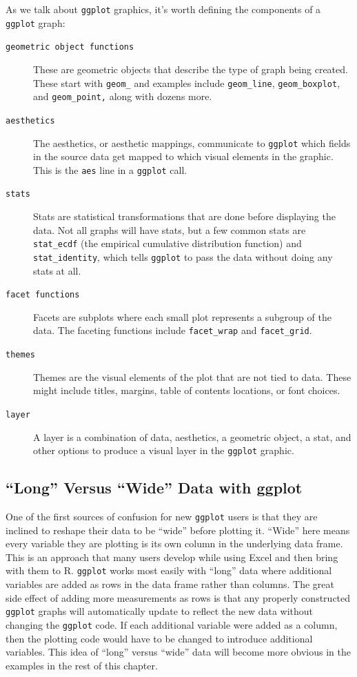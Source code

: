 \documentclass[
]{book}
\begin{document}
As we talk about \texttt{ggplot} graphics, it's worth defining the components of a \texttt{ggplot} graph:

\begin{description}
\item[\texttt{geometric\ object\ functions}]
These are geometric objects that describe the type of graph being created. These start with \texttt{geom\_} and examples include \texttt{geom\_line}, \texttt{geom\_boxplot}, and \texttt{geom\_point,} along with dozens more.
\item[\texttt{aesthetics}]
The aesthetics, or aesthetic mappings, communicate to \texttt{ggplot} which fields in the source data get mapped to which visual elements in the graphic. This is the \texttt{aes} line in a \texttt{ggplot} call.
\item[\texttt{stats}]
Stats are statistical transformations that are done before displaying the data. Not all graphs will have stats, but a few common stats are \texttt{stat\_ecdf} (the empirical cumulative distribution function) and \texttt{stat\_identity}, which tells \texttt{ggplot} to pass the data without doing any stats at all.
\item[\texttt{facet\ functions}]
Facets are subplots where each small plot represents a subgroup of the data. The faceting functions include \texttt{facet\_wrap} and \texttt{facet\_grid}.
\item[\texttt{themes}]
Themes are the visual elements of the plot that are not tied to data. These might include titles, margins, table of contents locations, or font choices.
\item[\texttt{layer}]
A layer is a combination of data, aesthetics, a geometric object, a stat, and other options to produce a visual layer in the \texttt{ggplot} graphic.
\end{description}

\hypertarget{long-versus-wide-data-with-ggplot}{%
\subsection*{``Long'' Versus ``Wide'' Data with ggplot}\label{long-versus-wide-data-with-ggplot}}

One of the first sources of confusion for new \texttt{ggplot} users is that they are inclined to reshape their data to be ``wide'' before plotting it. ``Wide'' here means every variable they are plotting is its own column in the underlying data frame. This is an approach that many users develop while using Excel and then bring with them to R. \texttt{ggplot} works most easily with ``long'' data where additional variables are added as rows in the data frame rather than columns. The great side effect of adding more measurements as rows is that any properly constructed \texttt{ggplot} graphs will automatically update to reflect the new data without changing the \texttt{ggplot} code. If each additional variable were added as a column, then the plotting code would have to be changed to introduce additional variables. This idea of ``long'' versus ``wide'' data will become more obvious in the examples in the rest of this chapter.
\end{document}
